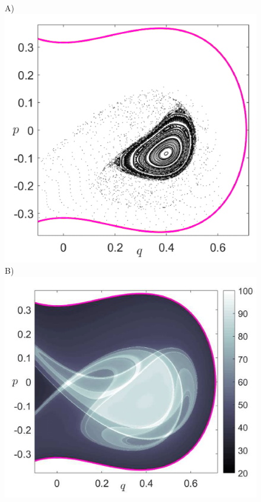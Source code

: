 \documentclass[8pt]{article}
\begin{document}
\begin{figure}[!ht]
	\begin{center}		
		A)\includegraphics[scale=0.12]{fig12a.png}
		B)\includegraphics[scale=0.12]{fig12b.png}

\end{center}
\end{figure}
\end{document}

